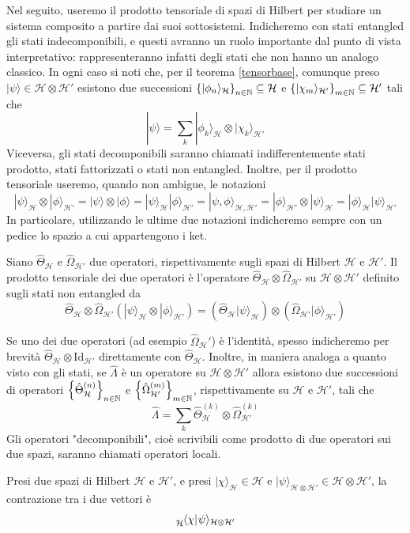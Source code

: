 \documentclass[a4paper, 11pt]{article}
\renewcommand{\H}{\mathcal{H}}
\newcommand{\id}{\mathrm{Id}}
\renewcommand{\ket}[1]{| #1\rangle}
\renewcommand{\bra}[1]{\langle #1|}
\begin{document}
Nel seguito, useremo il prodotto tensoriale di spazi di Hilbert per studiare un sistema composito a partire dai suoi sottosistemi. Indicheremo con stati entangled gli stati indecomponibili, e questi avranno un ruolo importante dal punto di vista interpretativo: rappresenteranno infatti degli stati che non hanno un analogo classico. In ogni caso si noti che, per il teorema \ref{tensorbase}, comunque preso $\ket{\psi}\in\H\otimes\H'$ esistono due successioni $\left\{\ket{\phi_n}_\H\right\}_{n\in\N}\subseteq\H$ e $\left\{\ket{\chi_m}_{\H'}\right\}_{m\in \N}\subseteq\H'$ tali che 
\[\ket{\psi}=\sum_{k}\ket{\phi_k}_\H\otimes\ket{\chi_k}_{\H'}\]
Viceversa, gli stati decomponibili saranno chiamati indifferentemente stati prodotto, stati fattorizzati o stati non entangled. Inoltre, per il prodotto tensoriale useremo, quando non ambigue, le notazioni \[\ket{\psi}_{\H}\otimes\ket{\phi}_{\H'}=\ket{\psi}\otimes\ket{\phi}=\ket{\psi}_\H\ket{\phi}_{\H'}=\ket{\psi,\phi}_{\H,\H'}=\ket{\phi}_{\H'}\otimes\ket{\psi}_\H=\ket{\phi}_\H\ket{\psi}_{\H'}\]
In particolare, utilizzando le ultime due notazioni indicheremo sempre con un pedice lo spazio a cui appartengono i ket.
\begin{definition}
	Siano $\hat{\Theta}_{\H}$ e $\hat{\Omega}_{\H'}$ due operatori, rispettivamente sugli spazi di Hilbert $\H$ e $\H'$. Il prodotto tensoriale dei due operatori è l'operatore $\hat{\Theta}_\H\otimes\hat{\Omega}_{\H'}$ su $\H\otimes\H'$ definito sugli stati non entangled da
	\[\hat{\Theta}_\H\otimes\hat{\Omega}_{\H'}(\ket{\psi}_\H\otimes\ket{\phi}_{\H'})=(\hat{\Theta}_\H\ket{\psi}_\H)\otimes(\hat{\Omega}_{\H'}\ket{\phi}_{\H'})\]
\end{definition}
Se uno dei due operatori (ad esempio $\hat{\Omega}_\H'$) è l'identità, spesso indicheremo per brevità $\hat{\Theta}_\H\otimes\id_{\H'}$ direttamente con $\hat{\Theta}_\H$.
Inoltre, in maniera analoga a quanto visto con gli stati, se $\hat{\Lambda}$ è un operatore su $\H\otimes\H'$ allora esistono due successioni di operatori $\left\{\hat{\Theta}_{\H}^{(n)}\right\}_{n\in \N}$ e $\left\{\hat{\Omega}_{\H'}^{(m)}\right\}_{m\in \N}$, rispettivamente su $\H$ e $\H'$, tali che
\[\hat{\Lambda}=\sum_{k}\hat{\Theta}_{\H}^{(k)}\otimes\hat{\Omega}_{\H'}^{(k)}\]
Gli operatori "decomponibili", cioè scrivibili come prodotto di due operatori sui due spazi, saranno chiamati operatori locali.
\begin{definition}[Contrazione]
	Presi due spazi di Hilbert $\H$ e $\H'$, e presi $\ket{\chi}_{\H}\in\H$ e $\ket{\psi}_{\H\otimes\H'}\in \H\otimes\H'$, la contrazione tra i due vettori è 
	\[\tensor*[_{\H}]{\bra{\chi}}{}\psi\rangle_{\H\otimes\H'}\]
\end{definition}
\end{document}
